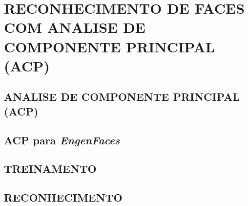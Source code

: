 \section{RECONHECIMENTO DE FACES COM ANALISE DE COMPONENTE PRINCIPAL (ACP) }\label{sec:recog_faces}


\subsection{ANALISE DE COMPONENTE PRINCIPAL (ACP)}\label{subsec:acp}


\subsection{ACP para \textit{EngenFaces}}\label{subsec:acp}

\subsection{TREINAMENTO}\label{subsec:treiamento}

\subsection{RECONHECIMENTO}\label{subsec:reconhecimento}



























